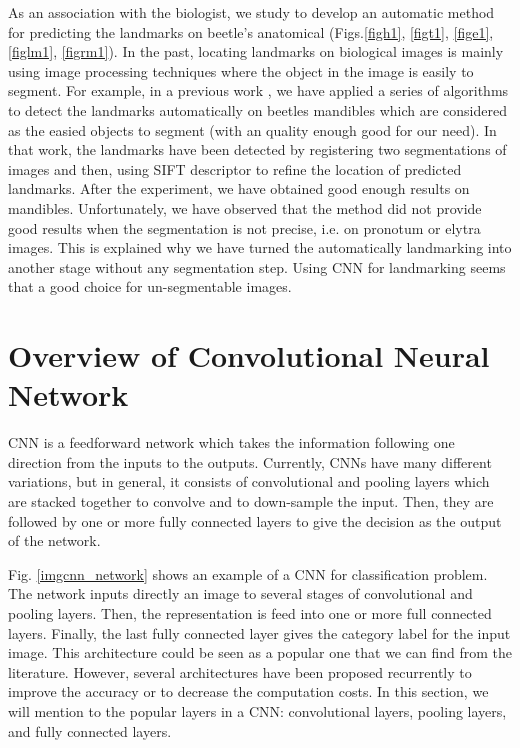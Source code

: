 \documentclass[review]{elsarticle}
\begin{document}
As an association with the biologist, we study to develop an automatic method for predicting the landmarks on beetle's anatomical (Figs.\ref{figh1}, \ref{figt1}, \ref{fige1}, \ref{figlm1}, \ref{figrm1}). In the past, locating landmarks on biological images is mainly using image processing techniques where the object in the image is easily to segment. For example, in a previous work \cite{le2017maelab}, we have applied a series of algorithms to detect the landmarks automatically on beetles mandibles which are considered as the easied objects to segment (with an quality enough good for our need). In that work, the landmarks have been detected by registering two segmentations of images and then, using SIFT descriptor to refine the location of predicted landmarks. After the experiment, we have obtained good enough results on mandibles. Unfortunately, we have observed that the method did not provide good results when the segmentation is not precise, i.e. on pronotum or elytra images. This is explained why we have turned the automatically landmarking into another stage without any segmentation step. Using CNN for landmarking seems that a good choice for un-segmentable images.

\section{Overview of Convolutional Neural Network}
\label{sOverview}
CNN is a feedforward network which takes the information following one direction from the inputs to the outputs. Currently, CNNs have many different variations, but in general, it consists of convolutional and pooling layers which are stacked together to convolve and to down-sample the input. Then, they are followed by one or more fully connected layers to give the decision as the output of the network. 

Fig. \ref{imgcnn_network} shows an example of a CNN for classification problem. The network inputs directly an image to several stages of convolutional and pooling layers. Then, the representation is feed into one or more full connected layers. Finally, the last fully connected layer gives the category label for the input image. This architecture could be seen as a popular one that we can find from the literature. However, several architectures have been proposed recurrently to improve the accuracy or to decrease the computation costs. In this section, we will mention to the popular layers in a CNN: convolutional layers, pooling layers, and fully connected layers.
\end{document}
